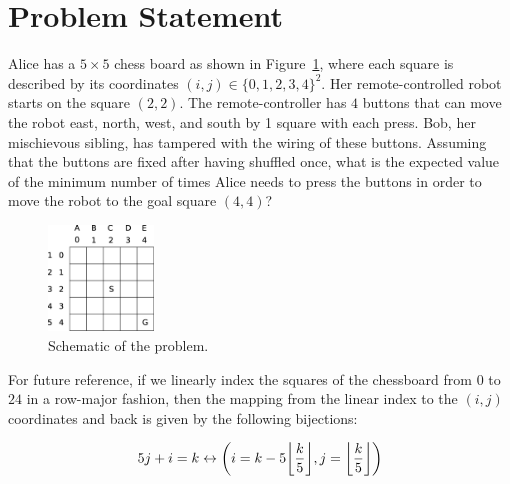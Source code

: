 \section{Problem Statement}
\label{sec:problem}
%
Alice has a $5 \times 5$ chess board as shown in Figure~\ref{fig:problem}, where
each square is described by its coordinates $(i, j) \in \{0, 1, 2, 3, 4\}^2$.
Her remote-controlled robot starts on the square $(2,2)$. The remote-controller
has $4$ buttons that can move the robot east, north, west, and south by 1 square
with each press. Bob, her mischievous sibling, has tampered with the wiring of
these buttons. Assuming that the buttons are fixed after having shuffled once,
what is the expected value of the minimum number of times Alice needs to press
the buttons in order to move the robot to the goal square $(4,4)$?

\begin{figure}[bth]
    \centering
    \includegraphics[width=0.25\textwidth]{./figures/drawing_v1.eps}
    \caption{Schematic of the problem.}
    \label{fig:problem}
\end{figure}

For future reference, if we linearly index the squares of the chessboard from 
$0$ to $24$ in a row-major fashion, then the mapping from the linear index to
the $(i, j)$ coordinates and back is given by the following bijections:

\begin{equation}
5j + i = k \leftrightarrow \left(i = k - 5 \floor*{\frac{k}{5}}, j = \floor*{\frac{k}{5}}\right) 
\label{eq:bijection}
\end{equation}
